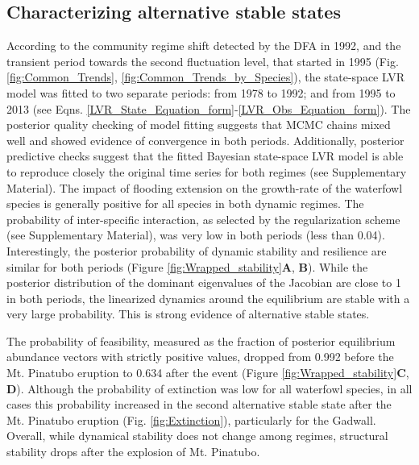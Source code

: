 \documentclass[12pt]{article}
\begin{document}
\subsection*{Characterizing alternative stable states}
\label{subsec:ASSRes}

According to the community regime shift detected by the DFA in 1992, and the transient period towards the second fluctuation level, that started in 1995 (Fig. \ref{fig:Common_Trends}, \ref{fig:Common_Trends_by_Species}), the state-space LVR model was fitted to two separate periods: from 1978 to 1992; and from 1995 to 2013 (see Eqns. \ref{LVR_State_Equation_form}-\ref{LVR_Obs_Equation_form}). The posterior quality checking of model fitting suggests that MCMC chains mixed well and showed evidence of convergence in both periods. Additionally, posterior predictive checks suggest that the fitted Bayesian state-space LVR model is able to reproduce closely the original time series for both regimes (see Supplementary Material). The impact of flooding extension on the growth-rate of the waterfowl species is generally positive for all species in both dynamic regimes. The probability of inter-specific interaction, as selected by the regularization scheme (see Supplementary Material), was very low in both periods (less than 0.04). Interestingly, the posterior probability of dynamic stability and resilience are similar for both periods (Figure \ref{fig:Wrapped_stability}\textbf{A}, \textbf{B}). While the posterior distribution of the dominant eigenvalues of the Jacobian are close to 1 in both periods, the linearized dynamics around the equilibrium are stable with a very large probability. This is strong evidence of alternative stable states.

The probability of feasibility, measured as the fraction of posterior equilibrium abundance vectors with strictly positive values, dropped from 0.992 before the Mt. Pinatubo eruption to 0.634 after the event (Figure \ref{fig:Wrapped_stability}\textbf{C}, \textbf{D}). Although the probability of extinction was low for all waterfowl species, in all cases this probability increased in the second alternative stable state after the Mt. Pinatubo eruption (Fig. \ref{fig:Extinction}), particularly for the Gadwall. Overall, while dynamical stability does not change among regimes, structural stability drops after the explosion of Mt. Pinatubo.\\
\end{document}
